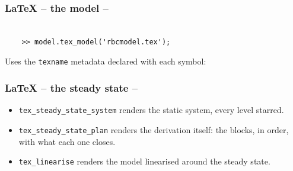 \documentclass[10pt,slidestop]{beamer}
\theoremstyle{plain}
\begin{document}
\begin{frame}[c,fragile]
  \frametitle{LaTeX -- the model --}

  \begin{lstlisting}[style=MatlabConsole]

    >> model.tex_model('rbcmodel.tex');
  \end{lstlisting}

  \medskip

  Uses the \verb+texname+ metadata declared with each symbol:

  \medskip


\end{frame}


\begin{frame}[c,fragile]
  \frametitle{LaTeX -- the steady state --}

  \begin{itemize}

  \item \verb+tex_steady_state_system+ renders the static system, every level
    starred.\newline

  \item \verb+tex_steady_state_plan+ renders the derivation itself: the blocks,
    in order, with what each one closes.\newline

  \item \verb+tex_linearise+ renders the model linearised around the steady
    state.

  \end{itemize}

  \medskip


\end{frame}
\end{document}
